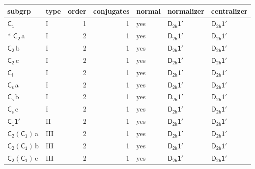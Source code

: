 \documentclass[10pt,a4paper]{article}
\numberwithin{equation}{section}
\newcommand{\grp}[1]{\mathsf{#1}}
\newcommand{\clsletter}[1]{\,{\scriptsize\color{black!55}#1}}
\begin{document}
{\small\begin{longtable}{@{}llrrlll@{}}\toprule
subgrp & type & order & conjugates & normal & normalizer & centralizer\\\midrule\endhead
\bottomrule\endfoot\endlastfoot
\href{../../../rotation/data/pdf/C1.pdf}{$\grp{C_{1}}$} & I & 1 & 1 & yes & \href{D2h-1p.pdf}{$\grp{D_{2h}1'}$} & \href{D2h-1p.pdf}{$\grp{D_{2h}1'}$}\\*
\href{../../../rotation/data/pdf/C2.pdf}{$\grp{C_{2}}$}\clsletter{a} & I & 2 & 1 & yes & \href{D2h-1p.pdf}{$\grp{D_{2h}1'}$} & \href{D2h-1p.pdf}{$\grp{D_{2h}1'}$}\\
\href{../../../rotation/data/pdf/C2.pdf}{$\grp{C_{2}}$}\clsletter{b} & I & 2 & 1 & yes & \href{D2h-1p.pdf}{$\grp{D_{2h}1'}$} & \href{D2h-1p.pdf}{$\grp{D_{2h}1'}$}\\
\href{../../../rotation/data/pdf/C2.pdf}{$\grp{C_{2}}$}\clsletter{c} & I & 2 & 1 & yes & \href{D2h-1p.pdf}{$\grp{D_{2h}1'}$} & \href{D2h-1p.pdf}{$\grp{D_{2h}1'}$}\\
\href{../../../rotation/data/pdf/S2.pdf}{$\grp{C_{i}}$} & I & 2 & 1 & yes & \href{D2h-1p.pdf}{$\grp{D_{2h}1'}$} & \href{D2h-1p.pdf}{$\grp{D_{2h}1'}$}\\
\href{../../../rotation/data/pdf/C1v.pdf}{$\grp{C_{s}}$}\clsletter{a} & I & 2 & 1 & yes & \href{D2h-1p.pdf}{$\grp{D_{2h}1'}$} & \href{D2h-1p.pdf}{$\grp{D_{2h}1'}$}\\
\href{../../../rotation/data/pdf/C1v.pdf}{$\grp{C_{s}}$}\clsletter{b} & I & 2 & 1 & yes & \href{D2h-1p.pdf}{$\grp{D_{2h}1'}$} & \href{D2h-1p.pdf}{$\grp{D_{2h}1'}$}\\
\href{../../../rotation/data/pdf/C1v.pdf}{$\grp{C_{s}}$}\clsletter{c} & I & 2 & 1 & yes & \href{D2h-1p.pdf}{$\grp{D_{2h}1'}$} & \href{D2h-1p.pdf}{$\grp{D_{2h}1'}$}\\
\href{C1-1p.pdf}{$\grp{C_{1}1'}$} & II & 2 & 1 & yes & \href{D2h-1p.pdf}{$\grp{D_{2h}1'}$} & \href{D2h-1p.pdf}{$\grp{D_{2h}1'}$}\\
\href{C2-C1.pdf}{$\grp{C_{2}}(\grp{C_{1}})$}\clsletter{a} & III & 2 & 1 & yes & \href{D2h-1p.pdf}{$\grp{D_{2h}1'}$} & \href{D2h-1p.pdf}{$\grp{D_{2h}1'}$}\\
\href{C2-C1.pdf}{$\grp{C_{2}}(\grp{C_{1}})$}\clsletter{b} & III & 2 & 1 & yes & \href{D2h-1p.pdf}{$\grp{D_{2h}1'}$} & \href{D2h-1p.pdf}{$\grp{D_{2h}1'}$}\\
\href{C2-C1.pdf}{$\grp{C_{2}}(\grp{C_{1}})$}\clsletter{c} & III & 2 & 1 & yes & \href{D2h-1p.pdf}{$\grp{D_{2h}1'}$} & \href{D2h-1p.pdf}{$\grp{D_{2h}1'}$}\\

\end{longtable}}
\end{document}
